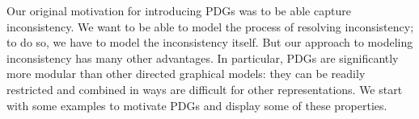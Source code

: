 \documentclass{article}
\numberwithin{equation}{section}
\begin{document}
Our original motivation for introducing PDGs was to be able capture
inconsistency. We want to be
able to model the process of resolving inconsistency; to do so, we have to model
the inconsistency itself. But our approach to modeling inconsistency
has many other advantages. 
In particular, PDGs are significantly more modular than other directed
graphical models: they can be readily restricted and combined in ways
are difficult for other representations.  
We start with some examples to motivate PDGs and display some of these
properties. 
\end{document}
